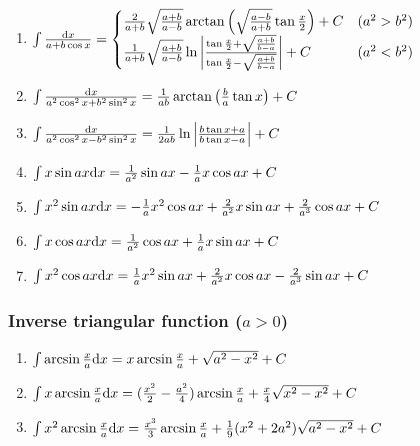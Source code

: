 \begin{tiny}
\begin{enumerate}[noitemsep]
\item $ \int \frac{\mathrm{d} x}{a + b \cos x} = \begin{cases}
\frac{2}{a+b}\sqrt\frac{a+b}{a-b} \arctan\left(\sqrt\frac{a-b}{a+b}\tan\frac{x}{2}\right) + C & (a^2 > b^2) \\
\frac{1}{a+b}\sqrt\frac{a+b}{a-b} \ln \left| \frac{\tan\frac{x}{2}+\sqrt\frac{a+b}{b-a}}{\tan\frac{x}{2}-\sqrt\frac{a+b}{b-a}} \right| + C
& (a^2 < b^2)
\end{cases} $

\item $ \int \frac{\mathrm{d} x}{a^2\cos^2x+b^2\sin^2x} = \frac{1}{ab} \arctan\left( \frac{b}{a}\tan x \right) + C $

\item $ \int \frac{\mathrm{d} x}{a^2\cos^2x-b^2\sin^2x} = \frac{1}{2ab}\ln\left|\frac{b\tan x+a}{b\tan x-a}\right| + C $

\item $ \int x \sin ax \mathrm{d} x = \frac{1}{a^2} \sin ax - \frac{1}{a} x \cos ax + C $

\item $ \int x^2 \sin ax \mathrm{d} x = -\frac{1}{a} x^2 \cos ax + \frac{2}{a^2} x \sin ax + \frac{2}{a^3} \cos ax + C$

\item $ \int x \cos ax \mathrm{d} x = \frac{1}{a^2} \cos ax + \frac{1}{a} x \sin ax + C $

\item $ \int x^2 \cos ax \mathrm{d} x = \frac{1}{a} x^2 \sin ax + \frac{2}{a^2} x \cos ax - \frac{2}{a^3} \sin ax + C $

\end{enumerate}

\subsubsection{Inverse triangular function ($a>0$)}

\begin {enumerate}[noitemsep]

\item $ \int \arcsin \frac{x}{a} \mathrm{d} x = x \arcsin \frac{x}{a} + \sqrt{a^2-x^2}+C $

\item $ \int x \arcsin \frac{x}{a} \mathrm{d} x= (\frac{x^2}{2}-\frac{a^2}{4})\arcsin \frac{x}{a} + \frac{x}{4} \sqrt{x^2-x^2}+C$

\item $ \int x^2 \arcsin \frac{x}{a} \mathrm{d} x = \frac{x^3}{3}\arcsin \frac{x}{a}+\frac{1}{9}(x^2+2 a^2)\sqrt{a^2-x^2}+C $


\end{enumerate}
\end{tiny}
